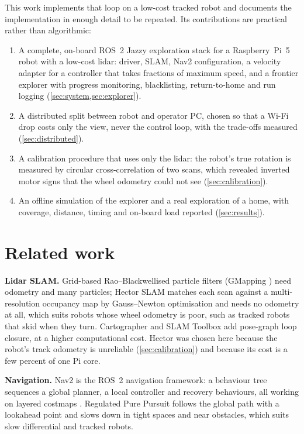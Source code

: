 \documentclass[10pt,twocolumn]{article}
\begin{document}
This work implements that loop on a low-cost tracked robot and documents the implementation in
enough detail to be repeated. Its contributions are practical rather than algorithmic:
\begin{enumerate}
\item A complete, on-board ROS~2 Jazzy exploration stack for a Raspberry~Pi~5 robot with a
  low-cost lidar: driver, SLAM, Nav2 configuration, a velocity adapter for a controller that takes
  fractions of maximum speed, and a frontier explorer with progress monitoring, blacklisting,
  return-to-home and run logging (\cref{sec:system,sec:explorer}).
\item A distributed split between robot and operator PC, chosen so that a Wi-Fi drop costs
  only the view, never the control loop, with the trade-offs measured (\cref{sec:distributed}).
\item A calibration procedure that uses only the lidar: the robot's true rotation is measured
  by circular cross-correlation of two scans, which revealed inverted motor signs that the
  wheel odometry could not see (\cref{sec:calibration}).
\item An offline simulation of the explorer and a real exploration of a home, with coverage,
  distance, timing and on-board load reported (\cref{sec:results}).
\end{enumerate}

\section{Related work}
\textbf{Lidar SLAM.} Grid-based Rao--Blackwellised particle filters (GMapping
\cite{grisetti2007}) need odometry and many particles; Hector SLAM \cite{kohlbrecher2011}
matches each scan against a multi-resolution occupancy map by Gauss--Newton optimisation and
needs no odometry at all, which suits robots whose wheel odometry is poor, such as tracked
robots that skid when they turn. Cartographer \cite{hess2016} and SLAM Toolbox \cite{macenski2021slam}
add pose-graph loop closure, at a higher computational cost. Hector was chosen here because the
robot's track odometry is unreliable (\cref{sec:calibration}) and because its cost is a few
percent of one Pi core.

\textbf{Navigation.} Nav2 \cite{macenski2020nav2} is the ROS~2 navigation framework: a
behaviour tree sequences a global planner, a local controller and recovery behaviours, all
working on layered costmaps \cite{lu2014layered}. Regulated Pure Pursuit \cite{macenski2023rpp}
follows the global path with a lookahead point and slows down in tight spaces and near
obstacles, which suits slow differential and tracked robots.
\end{document}
